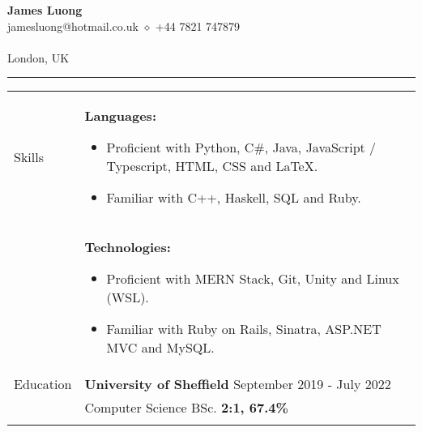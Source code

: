 \documentclass[11pt]{article}
\begin{document}
\begin{minipage}[t][0pt]{\linewidth} %
\begin{center}
	{\LARGE\textbf{James Luong}} \\
	jamesluong@hotmail.co.uk $\diamond$ +44 7821 747879 \\
	
	\href{https://jluong23.github.io/blog}{\color{Blue}{jluong23.github.io/blog}} \\
	
	London, UK \\
	\hrule
\end{center}


\begin{tabular}[t]{p{2cm} p{14cm}}
	{Skills} &
		\textbf{Languages:} 
	    \begin{itemize}
    		\renewcommand{\labelitemi}{$\diamond$}
    			\item Proficient with Python, C\#, Java, JavaScript / Typescript, HTML, CSS and \LaTeX. 
    			\item Familiar with C++, Haskell, SQL and Ruby.
		\end{itemize} \\ &

		\textbf{Technologies:} 
	    \begin{itemize}
    		\renewcommand{\labelitemi}{$\diamond$}
    			\item Proficient with MERN Stack, Git, Unity and Linux (WSL).
    			\item Familiar with Ruby on Rails, Sinatra, ASP.NET MVC and MySQL.
		\end{itemize} \\
	{Education} &

		\textbf{University of Sheffield} \hfill September 2019 - July 2022 \\ &
		Computer Science BSc. \hfill \textbf{2:1, 67.4\%}  \\ &


\end{tabular}
\end{minipage}
\end{document}
